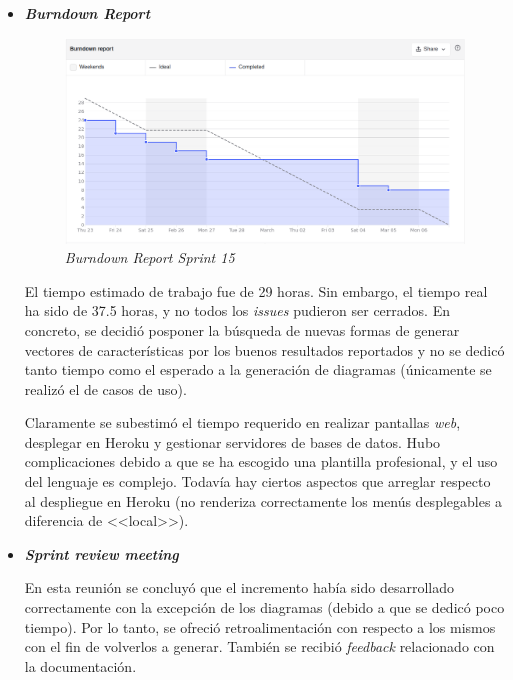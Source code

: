 \begin{itemize}
	\item \textbf{\textit{Burndown Report}}
	
	\begin{figure}[h]
		\caption{\textit{Burndown Report Sprint 15}}
		\centering
		\includegraphics[width=\textwidth]{../img/anexos/bdr/s15_bdr}
	\end{figure}
	
	El tiempo estimado de trabajo fue de 29 horas. Sin embargo, el tiempo real ha sido de 37.5 horas, y no todos los \textit{issues} pudieron ser cerrados. En concreto, se decidió posponer la búsqueda de nuevas formas de generar vectores de características por los buenos resultados reportados y no se dedicó tanto tiempo como el esperado a la generación de diagramas (únicamente se realizó el de casos de uso).
	
	Claramente se subestimó el tiempo requerido en realizar pantallas \textit{web}, desplegar en Heroku y gestionar servidores de bases de datos. Hubo complicaciones debido a que se ha escogido una plantilla profesional, y el uso del lenguaje es complejo. Todavía hay ciertos aspectos que arreglar respecto al despliegue en Heroku (no renderiza correctamente los menús desplegables a diferencia de <<local>>).
	
	\item \textbf{\textit{Sprint review meeting}}
	
	En esta reunión se concluyó que el incremento había sido desarrollado correctamente con la excepción de los diagramas (debido a que se dedicó poco tiempo). Por lo tanto, se ofreció retroalimentación con respecto a los mismos con el fin de volverlos a generar. También se recibió \textit{feedback} relacionado con la documentación.
\end{itemize}


